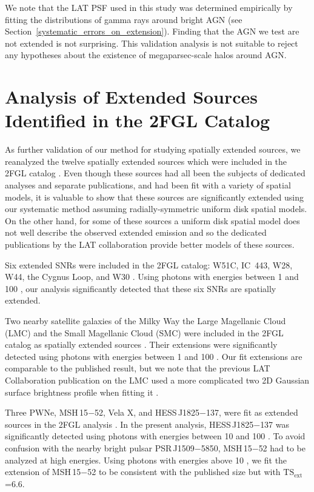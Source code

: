 \documentclass[12pt,preprint]{aastex}
\newcommand{\gev}{\text{GeV}\xspace}
\newcommand{\tsext}{{\ensuremath{\text{TS}_{\text{ext}}}}\xspace}
\begin{document}
We note that the LAT PSF used in this study was determined
empirically by fitting the distributions of gamma rays around bright AGN (see
Section~\ref{systematic_errors_on_extension}). Finding that the AGN we
test are not extended is not surprising.  This validation analysis is
not suitable to reject any hypotheses about the existence of megaparsec-scale
halos around AGN.

\section{Analysis of Extended Sources Identified in the 2FGL Catalog}
\label{validate_known}

As further validation of our method for studying
spatially extended sources, we reanalyzed the twelve spatially extended
sources which were included in the 2FGL catalog \citep{second_cat}.  
Even though these sources had all been the subjects of dedicated
analyses and separate publications, and had been fit with a variety
of spatial models,
it is valuable to show that
these sources are significantly extended using our systematic 
method assuming radially-symmetric uniform disk spatial models.  On the other hand, for some of
these sources a uniform disk spatial model does not well describe the
observed extended emission and so the dedicated 
publications by the LAT collaboration provide better models of these sources.



Six extended SNRs were
included in the 2FGL catalog: W51C, IC~443, W28, W44, the Cygnus Loop,
and W30
\citep{w51c,ic443,w28,w44,cygnus_loop_lat,w30_lat}.
Using photons
with energies between
1 \gev and 100 \gev, our analysis significantly detected
that these six SNRs are spatially extended.


Two nearby satellite galaxies of the Milky Way the Large Magellanic Cloud (LMC)
and the Small Magellanic
Cloud (SMC) were included in the 2FGL catalog as spatially extended sources \citep{lmc,smc}.  
Their extensions were significantly
detected using photons with energies between
1 \gev and 100 \gev. Our
fit extensions are comparable to the published result, but we note that
the previous LAT Collaboration publication on the LMC used a more complicated two 2D Gaussian surface
brightness profile when fitting it \citep{lmc}.

Three PWNe, MSH\,15$-$52, Vela X, and HESS\,J1825$-$137, were fit as
extended sources in the 2FGL analysis \citep{msh1552,velax,fermi_hess_j1825}.  
In the present analysis, HESS\,J1825$-$137
was significantly detected using photons with energies between 10
\gev and 100 \gev.  To avoid confusion with the nearby bright pulsar
PSR\,J1509$-$5850, MSH\,15$-$52 had to be analyzed at high energies.
Using photons with energies above 10 \gev, we fit the extension of
MSH\,15$-$52 to be consistent with the published size but with \tsext=6.6.
\end{document}

